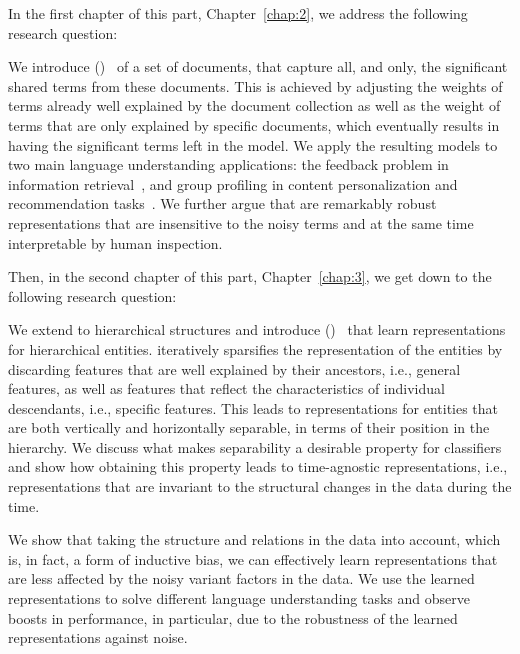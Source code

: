 In the first chapter of this part, Chapter~\ref{chap:2}, we address the following research question:

We introduce \emph{\swlms} (\acswlm)~\citep{Dehghani:2016:SIGIR} of a set of documents, that capture all, and only, the significant shared terms from these documents.  This is achieved by adjusting the weights of terms already well explained by the document collection as well as the weight of terms that are only explained by specific documents, which eventually results in having the significant terms left in the model. 
We apply the resulting models to two main language understanding applications: the feedback problem in information retrieval~\citep{Dehghani:CIKM2016:long, Dehghani:CIKM2016:short}, and group profiling in content personalization and recommendation tasks~\citep{Dehghani:2016:CHIIR,Dehghani2016:trec}. We further argue that \acswlm are remarkably robust representations that are insensitive to the noisy terms and at the same time interpretable by human inspection. 

Then, in the second chapter of this part, Chapter~\ref{chap:3}, we get down to the following research question:

We extend \emph{\swlms} to hierarchical structures and introduce \emph{\hswlms} (\achswlm)~\citep{Dehghani:2016:ICTIR, Dehghani:2016:CLEF} that learn representations for hierarchical entities. \achswlm iteratively sparsifies the representation of the entities by discarding features that are well explained by their ancestors, i.e., general features, as well as features that reflect the characteristics of individual descendants, i.e., specific features. This leads to representations for entities that are both vertically and horizontally separable, in terms of their position in the hierarchy. We discuss what makes separability a desirable property for classifiers and show how obtaining this property leads to time-agnostic representations, i.e., representations that are invariant to the structural changes in the data during the time.

\medskip
We show that taking the structure and relations in the data into account, which is, in fact, a form of inductive bias, we can effectively learn representations that are less affected by the noisy variant factors in the data. We use the learned representations to solve different language understanding tasks and observe boosts in performance, in particular, due to the robustness of the learned representations against noise.


